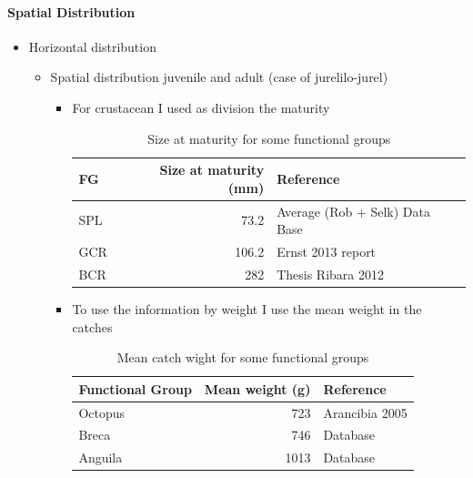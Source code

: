 \documentclass[11pt]{article}
\begin{document}
\paragraph*{Spatial Distribution}
\label{sec-5-2-1-6}
\begin{itemize}

\item Horizontal distribution
\label{sec-5-2-1-6-1}%
\begin{itemize}
\item Spatial distribution juvenile and adult (case of jurelilo-jurel)
\begin{itemize}
\item For crustacean I used as division the maturity
\begin{table}[htb]
\caption{Size at maturity for some functional groups}
\begin{center}
\begin{tabular}{lrl}
 FG   &  Size at maturity (mm)  &  Reference                       \\
\hline
 SPL  &                   73.2  &  Average (Rob + Selk) Data Base  \\
 GCR  &                  106.2  &  Ernst 2013 report               \\
 BCR  &                    282  &  Thesis Ribara 2012              \\
\end{tabular}
\end{center}
\end{table}

\item To use the information by weight I use the mean weight in the catches
\begin{table}[htb]
\caption{Mean catch wight for some functional groups}
\begin{center}
\begin{tabular}{lrl}
 Functional Group  &  Mean weight (g)  &  Reference       \\
\hline
 Octopus           &              723  &  Arancibia 2005  \\
 Breca             &              746  &  Database        \\
 Anguila           &             1013  &  Database        \\
\end{tabular}
\end{center}
\end{table}


\end{itemize}
\end{itemize}
\end{itemize}
\end{document}
